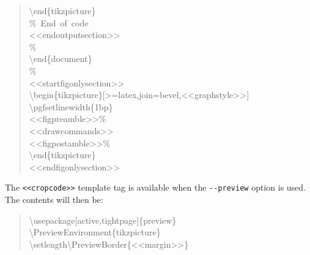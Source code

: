 \documentclass[10pt,a4paper,english]{article}
\begin{document}
\begin{quote}
{{\textbackslash}end{\{}tikzpicture{\}}~\\
{\%}~End~of~code~\\
<{}<endoutputsection>{}>~\\
{\%}~\\
{\textbackslash}end{\{}document{\}}~\\
{\%}~\\
<{}<startfigonlysection>{}>~\\
{\textbackslash}begin{\{}tikzpicture{\}}{[}>=latex,join=bevel,<{}<graphstyle>{}>{]}~\\
{\textbackslash}pgfsetlinewidth{\{}1bp{\}}~\\
<{}<figpreamble>{}>{\%}~\\
<{}<drawcommands>{}>~\\
<{}<figpostamble>{}>{\%}~\\
{\textbackslash}end{\{}tikzpicture{\}}~\\
<{}<endfigonlysection>{}>
}\end{quote}

The \texttt{<{}<cropcode>{}>} template tag is available when the \texttt{-{}-preview} option is used. The contents will then be:
\begin{quote}{\ttfamily \raggedright \noindent
{\textbackslash}usepackage{[}active,tightpage{]}{\{}preview{\}}~\\
{\textbackslash}PreviewEnvironment{\{}tikzpicture{\}}~\\
{\textbackslash}setlength{\textbackslash}PreviewBorder{\{}<{}<margin>{}>{\}}
}\end{quote}



\hypertarget{default-pstricks-template}{}
\end{document}

